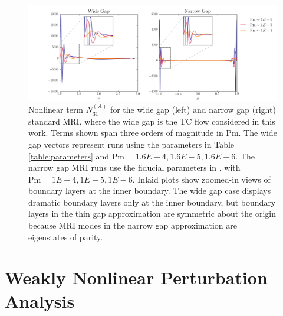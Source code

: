 \documentclass{emulateapj}
\newcommand{\Pm}{\mathrm{Pm}}
\begin{document}
\begin{figure}
\centering
\includegraphics[width=\textwidth]{../figures/widegap_thingap_comparison_zoombox.png}
\caption{Nonlinear term $N_{31}^{(A)}$ for the wide gap (left) and narrow gap (right) standard MRI, where the wide gap is the TC flow considered in this work. Terms shown span three orders of magnitude in $\Pm$. The wide gap vectors represent runs using the parameters in Table \ref{table:parameters} and $\Pm = 1.6E-4, 1.6E-5, 1.6E-6$. The narrow gap MRI runs use the fiducial parameters in \citet{Umurhan:2007hs}, with $\Pm = 1E-4, 1E-5, 1E-6$. Inlaid plots show zoomed-in views of boundary layers at the inner boundary. The wide gap case displays dramatic boundary layers only at the inner boundary, but boundary layers in the thin gap approximation are symmetric about the origin because MRI modes in the narrow gap approximation are eigenstates of parity.}\label{fig:thin_wide_comparison} 
\end{figure}


\section{Weakly Nonlinear Perturbation Analysis}\label{sec:wnl_analysis}
\label{sec:Perturbation}
\end{document}
